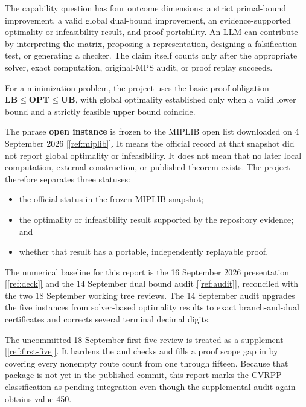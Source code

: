 \documentclass[11pt,letterpaper]{article}
\newcommand{\sourcecite}[1]{\hyperref[#1]{[\ref*{#1}]}}
\begin{document}
The capability question has four outcome dimensions: a strict primal-bound improvement, a valid global dual-bound improvement, an evidence-supported optimality or infeasibility result, and proof portability. An LLM can contribute by interpreting the matrix, proposing a representation, designing a falsification test, or generating a checker. The claim itself counts only after the appropriate solver, exact computation, original-MPS audit, or proof replay succeeds.

For a minimization problem, the project uses the basic proof obligation \(\mathbf{LB \leq OPT \leq UB}\), with global optimality established only when a valid lower bound and a strictly feasible upper bound coincide.

The phrase \textbf{open instance} is frozen to the MIPLIB open list downloaded on 4 September 2026 \sourcecite{ref:miplib}. It means the official record at that snapshot did not report global optimality or infeasibility. It does not mean that no later local computation, external construction, or published theorem exists. The project therefore separates three statuses:

\begin{itemize}
\item the official status in the frozen MIPLIB snapshot;
\item the optimality or infeasibility result supported by the repository evidence; and
\item whether that result has a portable, independently replayable proof.
\end{itemize}

The numerical baseline for this report is the 16 September 2026 presentation \sourcecite{ref:deck} and the 14 September dual bound audit \sourcecite{ref:audit}, reconciled with the two 18 September working tree reviews. The 14 September audit upgrades the five \texttt{} instances from solver-based optimality results to exact branch-and-dual certificates and corrects several terminal decimal digits.

The uncommitted 18 September first five review is treated as a supplement \sourcecite{ref:first-five}. It hardens the \texttt{} and \texttt{} checks and fills a proof scope gap in \texttt{} by covering every nonempty route count from one through fifteen. Because that package is not yet in the published commit, this report marks the CVRPP classification as pending integration even though the supplemental audit again obtains value 450.
\end{document}
